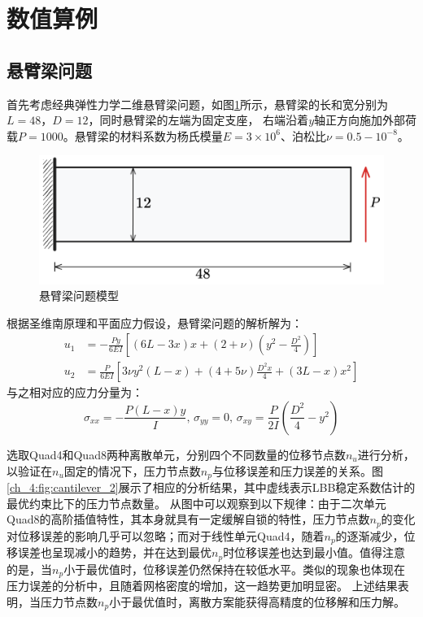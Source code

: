\section{数值算例}
\subsection{悬臂梁问题}

首先考虑经典弹性力学二维悬臂梁问题，如图\ref{ch_4:fig:cantilever}所示，悬臂梁的长和宽分别为$L=48$，$D=12$，同时悬臂梁的左端为固定支座，
右端沿着$y$轴正方向施加外部荷载$P=1000$。悬臂梁的材料系数为杨氏模量$E=3\times10^6$、泊松比$\nu=0.5-10^{-8}$。
\begin{figure}[!h]
    \centering 
        \includegraphics[scale=0.4]{figures/ch_4/cantilever.png}
        \caption{悬臂梁问题模型}\label{ch_4:fig:cantilever}
\end{figure}

根据圣维南原理和平面应力假设，悬臂梁问题的解析解为：
\begin{equation}
    \begin{split}
        u_1 &= -\frac{Py}{6EI}[(6L-3x)x + (2+\nu)(y^2 - \frac{D^2}{4})] \\
        u_2 &= \frac{P}{6EI}[3\nu y^2(L-x) + (4+5\nu)\frac{D^2x}{4} + (3L-x)x^2]
    \end{split}
\end{equation}
与之相对应的应力分量为：
\begin{equation}
       \sigma_{xx}=-\frac{P(L-x)y}{I},\,\sigma_{yy}=0,\,\sigma_{xy}=\frac{P}{2I}(\frac{D^2}{4}-y^2)
\end{equation}

选取Quad4和Quad8两种离散单元，分别四个不同数量的位移节点数$n_u$进行分析，以验证在$n_u$固定的情况下，压力节点数$n_p$与位移误差和压力误差的关系。图\ref{ch_4:fig:cantilever_2}展示了相应的分析结果，其中虚线表示LBB稳定系数估计的最优约束比下的压力节点数量。
从图中可以观察到以下规律：由于二次单元Quad8的高阶插值特性，其本身就具有一定缓解自锁的特性，压力节点数$n_p$的变化对位移误差的影响几乎可以忽略；而对于线性单元Quad4，随着$n_p$的逐渐减少，位移误差也呈现减小的趋势，并在达到最优$n_p$时位移误差也达到最小值。值得注意的是，当$n_p$小于最优值时，位移误差仍然保持在较低水平。类似的现象也体现在压力误差的分析中，且随着网格密度的增加，这一趋势更加明显密。
上述结果表明，当压力节点数$n_p$小于最优值时，离散方案能获得高精度的位移解和压力解。

